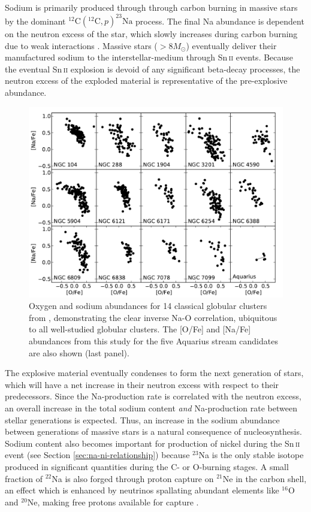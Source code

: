 \documentclass{emulateapj}
\begin{document}
Sodium is primarily produced through through carbon burning in massive stars by the dominant $^{12}\mbox{C}(^{12}\mbox{C}, p)^{23}\mbox{Na}$ process. The final Na abundance is dependent on the neutron excess of the star, which slowly increases during carbon burning due to weak interactions \citep{arnett;truran_1969}. Massive stars ($>8 M_\odot$) eventually deliver their manufactured sodium to the interstellar-medium through {Sn\,\textsc{ii}} events. Because the eventual {Sn\,\textsc{ii}} explosion is devoid of any significant beta-decay processes, the neutron excess of the exploded material is representative of the pre-explosive abundance.  
 

\begin{figure}[t!]
	\includegraphics[width=\textwidth]{./figures/aquarius-o-na-cluster.pdf}
	\caption{Oxygen and sodium abundances for 14 classical globular clusters from \citet{carretta;et-al_2009a}, demonstrating the clear inverse {Na-O} correlation, ubiquitous to all well-studied globular clusters. The [O/Fe] and [Na/Fe] abundances from this study for the five Aquarius stream candidates are also shown (last panel).}
	\label{fig:o-na-clusters}
\end{figure}


The explosive material eventually condenses to form the next generation of stars, which will have a net increase in their neutron excess with respect to their predecessors. Since the Na-production rate is correlated with the neutron excess, an overall increase in the total sodium content \textit{and} Na-production rate between stellar generations is expected. Thus, an increase in the sodium abundance between generations of massive stars is a natural consequence of nucleosynthesis. Sodium content also becomes important for production of nickel during the {Sn\,\textsc{ii}} event (see Section \ref{sec:na-ni-relationship}) because $^{23}$Na is the only stable isotope produced in significant quantities during the C- or O-burning stages. A small fraction of $^{22}$Na is also forged through proton capture on $^{21}$Ne in the carbon shell, an effect which is enhanced by neutrinos spallating abundant elements like $^{16}$O and $^{20}$Ne, making free protons available for capture \citep{woosley;weaver_1995}.
\end{document}
